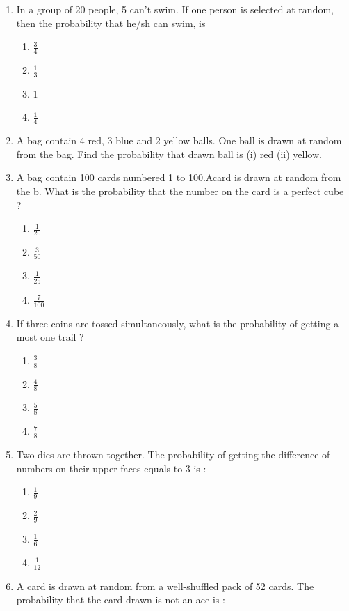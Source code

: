 \documentclass{article}
\begin{document}
\begin{enumerate}
\begin{enumerate}
			\end{enumerate}
	\item In a group of 20 people, 5 can't swim. If one person is selected at random, then the probability that he/sh can swim, is
			\begin{enumerate}
				\item $ \frac {3} {4} $
				\item $ \frac {1} {3} $
				\item 1
				\item $ \frac {1} {4} $ 
			\end{enumerate}
	\item A bag contain 4 red, 3 blue and 2 yellow balls. One ball is drawn at random from the bag. Find the probability that drawn ball is
		(i) red (ii) yellow.
	\item A bag contain 100 cards numbered 1 to 100.Acard is drawn at random from the b. What is the probability that the number on the card is a perfect cube ?
			\begin{enumerate}
				\item $ \frac {1} {20} $
				\item $ \frac {3} {50} $
				\item $ \frac {1} {25} $
				\item $ \frac {7} {100} $
			\end{enumerate}
	\item If three coins are tossed simultaneously, what is the probability of getting a most one trail ?
			\begin{enumerate}
				\item $ \frac {3} {8} $
				\item $ \frac {4} {8} $
				\item $ \frac {5} {8} $
				\item $ \frac {7} {8} $
			\end{enumerate}
	\item Two dics are thrown together. The probability of getting the difference of numbers on their upper faces equals to 3 is :
			\begin{enumerate}
				\item $ \frac {1} {9} $
				\item $ \frac {2} {9} $
				\item $ \frac {1} {6} $
				\item $ \frac {1} {12} $
			\end{enumerate}
	\item A card is drawn at random from a well-shuffled pack of 52 cards. The probability that the card drawn is not an ace is : 


\end{enumerate}
\end{document}
